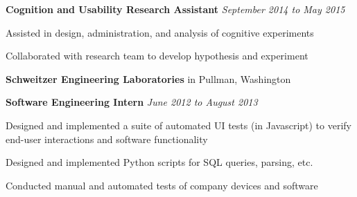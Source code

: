 \documentclass[12pt]{article}
\newcommand{\gdotfill}{\textcolor{lightgray}{\dotfill}}
\newenvironment{innerlist}[1][\enskip\textbullet]%
        {\begin{compactitem}[#1]}{\end{compactitem}}
\begin{document}
	\smallskip
	
	\begin{innerlist}
		\item[] \textbf{Cognition and Usability Research Assistant}
		\gdotfill \textit{September 2014 to May 2015}
		\begin{innerlist}
			\item {Assisted in design, administration, and analysis of cognitive experiments}
			\item {Collaborated with research team to develop hypothesis and experiment}
		\end{innerlist}
		
	\end{innerlist}
	
	\medskip
	
	\textbf{Schweitzer Engineering Laboratories} in Pullman, Washington
	
	\smallskip
	
	\begin{innerlist}
		\item[] \textbf{Software Engineering Intern}
		\gdotfill \textit{June 2012 to August 2013}
		\begin{innerlist}
			\item {Designed and implemented a suite of automated UI tests (in Javascript) to verify end-user interactions and software functionality}
			\item {Designed and implemented Python scripts for SQL queries, parsing, etc.}
			\item {Conducted manual and automated tests of company devices and software}
		\end{innerlist}
	\end{innerlist}
	
	
	

	
	\bigskip
		
\end{document}
